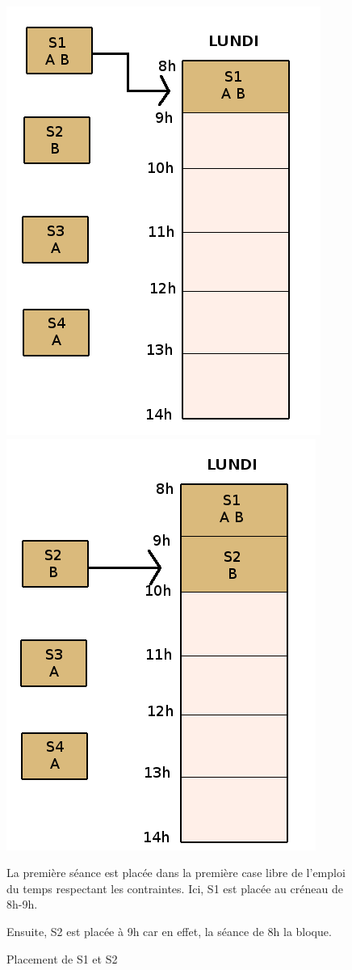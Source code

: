 \documentclass[12pt,a4paper,openany]{memoir}
\begin{document}
\begin{figure}[H]
    \includegraphics[scale=0.3]{img/Schema/Etape_1.png} \hfill
    \includegraphics[scale=0.3]{img/Schema/Etape_2.png}
    \caption{Placement de S1 et S2} \medbreak
    \par La première séance est placée dans la première case libre de l'emploi du temps respectant les contraintes. Ici, S1 est placée au créneau de 8h-9h.
    \par Ensuite, S2 est placée à 9h car en effet, la séance de 8h la bloque. 
\end{figure}
\end{document}
